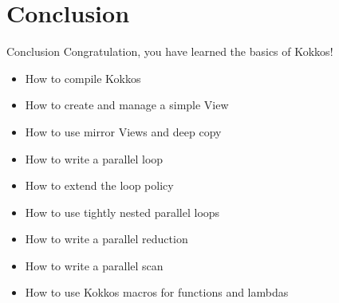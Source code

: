 \documentclass[
    aspectratio=169,
    \createHandout
]{beamer}
\begin{document}

\section[Conclusion]{Conclusion}


\begin{frame}{Conclusion}
    Congratulation, you have learned the basics of Kokkos!

    \begin{itemize}
        \item How to compile Kokkos
        \item How to create and manage a simple View
        \item How to use mirror Views and deep copy
        \item How to write a parallel loop
        \item How to extend the loop policy
        \item How to use tightly nested parallel loops
        \item How to write a parallel reduction
        \item How to write a parallel scan
        \item How to use Kokkos macros for functions and lambdas
    \end{itemize}
\end{frame}
\end{document}
